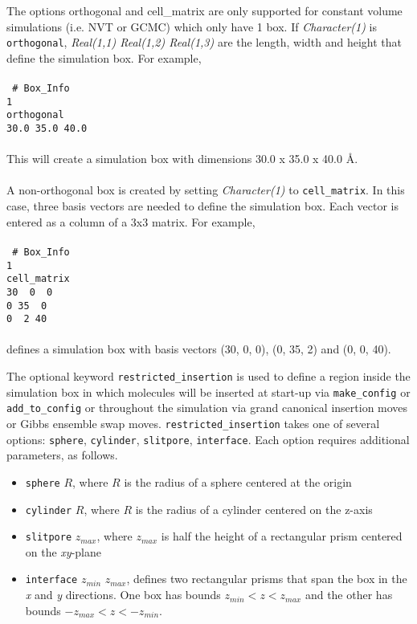 The options orthogonal and cell\_matrix are only supported for constant volume simulations 
(i.e. NVT or GCMC) which only have 1 box. 
If {\it Character(1)} is \texttt{orthogonal}, \emph{Real(1,1) Real(1,2) Real(1,3)} are the length, 
width and height that define the simulation box. For example, \\ \\
%
\texttt{
\# Box\_Info \\
 1 \\
 orthogonal \\
 30.0 35.0 40.0} \\ \\
%
This will create a simulation box with dimensions 30.0 x 35.0 x 40.0 \AA. \\ \\
%
A non-orthogonal box is created by setting {\it Character(1)} to \texttt{cell\_matrix}. 
In this case, three basis vectors are needed to define the simulation box.
Each vector is entered as a column of a 3x3 matrix.  
For example, \\ \\
%
\texttt{
\# Box\_Info \\
 1 \\
 cell\_matrix \\
 30 ~0 ~0\\
\hspace*{0.5em}0 35 ~0\\
\hspace*{0.5em}0 ~2 40} \\ \\
%
defines a simulation box with basis vectors (30, 0, 0), (0, 35, 2) and (0, 0, 40).

The optional keyword \texttt{restricted\_insertion} is used to define a region inside the simulation box 
in which molecules will be inserted at start-up via \texttt{make\_config} or \texttt{add\_to\_config}
or throughout the simulation via grand canonical insertion moves or Gibbs ensemble swap moves. 
\texttt{restricted\_insertion} takes one of several options: 
\texttt{sphere}, \texttt{cylinder}, \texttt{slitpore}, \texttt{interface}.
Each option requires additional parameters, as follows.

\begin{itemize}
	\item \texttt{sphere} $R$, 
	where $R$ is the radius of a sphere centered at the origin
	\item \texttt{cylinder} $R$, 
	where $R$ is the radius of a cylinder centered on the z-axis
	\item \texttt{slitpore} $z_{max}$, 
	where $z_{max}$ is half the height of a rectangular prism centered on the {\it xy}-plane
	\item \texttt{interface} $z_{min}$ $z_{max}$, 
	defines two rectangular prisms that span the box in the {\it x} and {\it y} directions. 
	One box has bounds $z_{min} < z < z_{max}$ and the other has bounds $-z_{max} < z < -z_{min}$.
\end{itemize}

